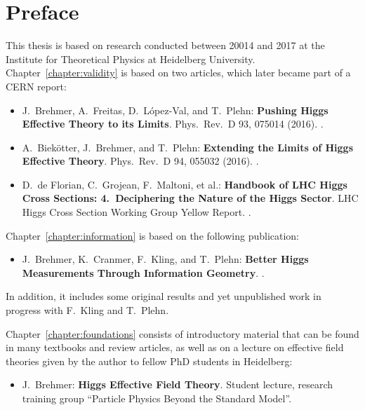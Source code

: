 
\chapter*{Preface}
\label{chapter:preface}

This thesis is based on research conducted between 20014 and 2017 at
the Institute for Theoretical Physics at Heidelberg
University. Chapter~\ref{chapter:validity} is based on two articles,
which later became part of a CERN report:
%
\begin{itemize}
  \item[\cite{Brehmer:2015rna}] J.~Brehmer, A.~Freitas, D.~L\'opez-Val, and T.~Plehn:\newline
	\textbf{Pushing Higgs Effective Theory to its Limits}.\newline
	Phys.~Rev.~D 93, 075014 (2016). .
  \item[\cite{Biekotter:2016ecg}] A.~Biek\"otter, J.~Brehmer, and T.~Plehn:\newline
	\textbf{Extending the Limits of Higgs Effective Theory}.\newline
	Phys.~Rev.~D 94, 055032 (2016). . 
  \item[\cite{deFlorian:2016spz}] D.~de Florian, C.~Grojean, F.~Maltoni, et al.:\newline
        \textbf{Handbook of LHC Higgs Cross Sections: 4.~Deciphering the Nature of the Higgs Sector}.\newline
        LHC Higgs Cross Section Working Group Yellow Report. .
\end{itemize}
%
Chapter~\ref{chapter:information} is based on the following publication:
%
\begin{itemize}
  \item[\cite{Brehmer:2016nyr}] J.~Brehmer, K.~Cranmer, F.~Kling, and T.~Plehn:\newline
	\textbf{Better Higgs Measurements Through Information Geometry}.\newline
       .
\end{itemize}
%
In addition, it includes some original results and yet unpublished
work in progress with F.~Kling and T.~Plehn.

Chapter~\ref{chapter:foundations} consists of introductory material
that can be found in many textbooks and review articles, as well as on
a lecture on effective field theories given by the author to fellow
PhD students in Heidelberg:
%
\begin{itemize}
  \item[\cite{Brehmer:EFTlecture}]  J.~Brehmer:\newline
	\textbf{Higgs Effective Field Theory}.\newline
        Student lecture, research training group ``Particle Physics Beyond the Standard Model''.
\end{itemize}

